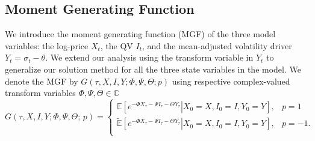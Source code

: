 \documentclass[pdftex,11pt,a4paper] {article}
\begin{document}
\subsection{Moment Generating Function}

We introduce the moment generating function (MGF) of the three model variables: the log-price $X_t$, the QV $I_t$, and the mean-adjusted volatility driver $Y_t=\sigma_{t}-\theta$. We extend our analysis using the transform variable in $Y_{t}$ to generalize our solution method for all the three state variables in the model. We denote the MGF by $G(\tau,X,I,Y; \Phi,\Psi, \Theta; p)$ using respective complex-valued transform variables $\Phi,\Psi,\Theta\in\mathbb{C}$
\begin{equation} \label{eq:mgf}
G(\tau,X,I,Y; \Phi,\Psi,\Theta;\,p) = 
\begin{cases}
\mathbb{E}[e^{-\Phi X_\tau-\Psi I_\tau-\Theta Y_\tau}\left.\right|X_0=X, I_0=I, Y_0=Y], & p=1\\
\tilde{\mathbb{E}}[e^{-\Phi X_\tau-\Psi I_\tau-\Theta Y_\tau}\left.\right|X_0=X, I_0=I, Y_0=Y], & p=-1.\\
\end{cases}
\end{equation}
\end{document}

